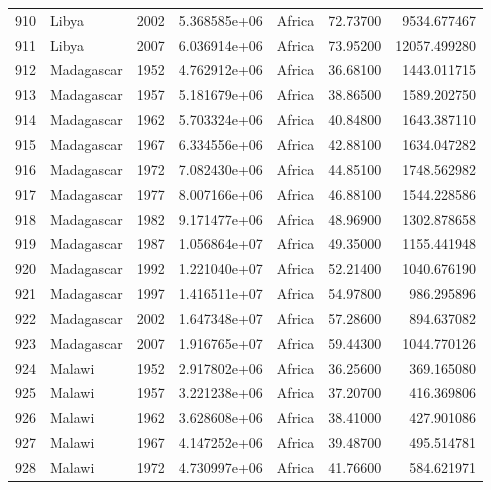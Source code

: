 \documentclass[
  letterpaper,
  DIV=11,
  numbers=noendperiod]{scrreprt}
\begin{document}
\begin{tabular}{llrrlrr}
910  &                     Libya &  2002 &  5.368585e+06 &    Africa &  72.73700 &    9534.677467 \\
911  &                     Libya &  2007 &  6.036914e+06 &    Africa &  73.95200 &   12057.499280 \\
912  &                Madagascar &  1952 &  4.762912e+06 &    Africa &  36.68100 &    1443.011715 \\
913  &                Madagascar &  1957 &  5.181679e+06 &    Africa &  38.86500 &    1589.202750 \\
914  &                Madagascar &  1962 &  5.703324e+06 &    Africa &  40.84800 &    1643.387110 \\
915  &                Madagascar &  1967 &  6.334556e+06 &    Africa &  42.88100 &    1634.047282 \\
916  &                Madagascar &  1972 &  7.082430e+06 &    Africa &  44.85100 &    1748.562982 \\
917  &                Madagascar &  1977 &  8.007166e+06 &    Africa &  46.88100 &    1544.228586 \\
918  &                Madagascar &  1982 &  9.171477e+06 &    Africa &  48.96900 &    1302.878658 \\
919  &                Madagascar &  1987 &  1.056864e+07 &    Africa &  49.35000 &    1155.441948 \\
920  &                Madagascar &  1992 &  1.221040e+07 &    Africa &  52.21400 &    1040.676190 \\
921  &                Madagascar &  1997 &  1.416511e+07 &    Africa &  54.97800 &     986.295896 \\
922  &                Madagascar &  2002 &  1.647348e+07 &    Africa &  57.28600 &     894.637082 \\
923  &                Madagascar &  2007 &  1.916765e+07 &    Africa &  59.44300 &    1044.770126 \\
924  &                    Malawi &  1952 &  2.917802e+06 &    Africa &  36.25600 &     369.165080 \\
925  &                    Malawi &  1957 &  3.221238e+06 &    Africa &  37.20700 &     416.369806 \\
926  &                    Malawi &  1962 &  3.628608e+06 &    Africa &  38.41000 &     427.901086 \\
927  &                    Malawi &  1967 &  4.147252e+06 &    Africa &  39.48700 &     495.514781 \\
928  &                    Malawi &  1972 &  4.730997e+06 &    Africa &  41.76600 &     584.621971 \\

\end{tabular}
\end{document}
